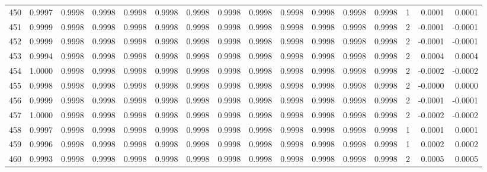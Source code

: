 \begin{tabular}{lrrrrrrrrrrrrrrr}
450 &      0.9997 &  0.9998 &  0.9998 &  0.9998 &  0.9998 &  0.9998 &  0.9998 &  0.9998 &  0.9998 &  0.9998 &   0.9998 &     0.9998 &      1 &                    0.0001 &                     0.0001 \\
451 &      0.9999 &  0.9998 &  0.9998 &  0.9998 &  0.9998 &  0.9998 &  0.9998 &  0.9998 &  0.9998 &  0.9998 &   0.9998 &     0.9998 &      2 &                   -0.0001 &                    -0.0001 \\
452 &      0.9999 &  0.9998 &  0.9998 &  0.9998 &  0.9998 &  0.9998 &  0.9998 &  0.9998 &  0.9998 &  0.9998 &   0.9998 &     0.9998 &      2 &                   -0.0001 &                    -0.0001 \\
453 &      0.9994 &  0.9998 &  0.9998 &  0.9998 &  0.9998 &  0.9998 &  0.9998 &  0.9998 &  0.9998 &  0.9998 &   0.9998 &     0.9998 &      2 &                    0.0004 &                     0.0004 \\
454 &      1.0000 &  0.9998 &  0.9998 &  0.9998 &  0.9998 &  0.9998 &  0.9998 &  0.9998 &  0.9998 &  0.9998 &   0.9998 &     0.9998 &      2 &                   -0.0002 &                    -0.0002 \\
455 &      0.9998 &  0.9998 &  0.9998 &  0.9998 &  0.9998 &  0.9998 &  0.9998 &  0.9998 &  0.9998 &  0.9998 &   0.9998 &     0.9998 &      2 &                   -0.0000 &                     0.0000 \\
456 &      0.9999 &  0.9998 &  0.9998 &  0.9998 &  0.9998 &  0.9998 &  0.9998 &  0.9998 &  0.9998 &  0.9998 &   0.9998 &     0.9998 &      2 &                   -0.0001 &                    -0.0001 \\
457 &      1.0000 &  0.9998 &  0.9998 &  0.9998 &  0.9998 &  0.9998 &  0.9998 &  0.9998 &  0.9998 &  0.9998 &   0.9998 &     0.9998 &      2 &                   -0.0002 &                    -0.0002 \\
458 &      0.9997 &  0.9998 &  0.9998 &  0.9998 &  0.9998 &  0.9998 &  0.9998 &  0.9998 &  0.9998 &  0.9998 &   0.9998 &     0.9998 &      1 &                    0.0001 &                     0.0001 \\
459 &      0.9996 &  0.9998 &  0.9998 &  0.9998 &  0.9998 &  0.9998 &  0.9998 &  0.9998 &  0.9998 &  0.9998 &   0.9998 &     0.9998 &      1 &                    0.0002 &                     0.0002 \\
460 &      0.9993 &  0.9998 &  0.9998 &  0.9998 &  0.9998 &  0.9998 &  0.9998 &  0.9998 &  0.9998 &  0.9998 &   0.9998 &     0.9998 &      2 &                    0.0005 &                     0.0005 \\

\end{tabular}
